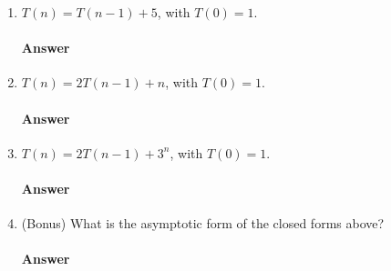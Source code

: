 \begin{enumerate}
    \item $T(n) = T(n-1) + 5$, with $T(0)=1$.
        \paragraph{Answer}
        \todo{}

    \item $T(n) = 2 T(n-1) + n$, with $T(0)=1$.
        \paragraph{Answer}
        \todo{}

    \item $T(n) = 2 T(n-1) + 3^n$, with $T(0)=1$.
        \paragraph{Answer}
        \todo{}

    \item (Bonus) What is the asymptotic form of the closed forms above?
        \paragraph{Answer}
        \todo{}
\end{enumerate}
